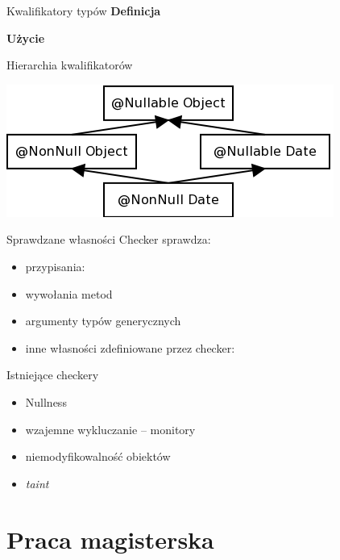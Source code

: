 \documentclass{beamer}
\begin{document}
\begin{frame}{Kwalifikatory typów}
  \textbf{Definicja}
  
  \textbf{Użycie}
  
\end{frame}
  
\begin{frame}{Hierarchia kwalifikatorów}
  
  \begin{center}
    \includegraphics[scale=0.6]{img/nullness.png}
  \end{center}
\end{frame}

\begin{frame}{Sprawdzane własności}
  Checker sprawdza:
  \begin{itemize}
  \item<1-> przypisania:
    
  \item<2-> wywołania metod
  \item<2-> argumenty typów generycznych
  \item<3-> inne własności zdefiniowane przez checker:
    
  \end{itemize}
\end{frame}

\begin{frame}{Istniejące checkery}
\begin{itemize}
\item<1-> Nullness
\item<2-> wzajemne wykluczanie -- monitory
\item<3-> niemodyfikowalność obiektów
\item<4-> \emph{taint}
\end{itemize}
\end{frame}

\section{Praca magisterska}
\end{document}

